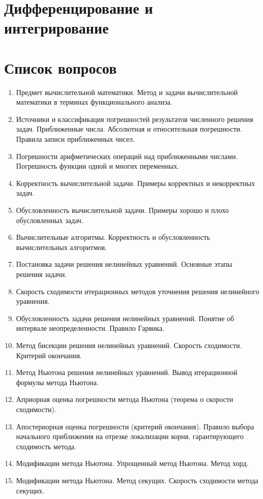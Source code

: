 \documentclass[14pt]{extarticle}
\begin{document}
\section{Дифференцирование и интегрирование}

\section{Список вопросов}
\begin{enumerate}
    \item Предмет вычислительной математики. Метод и задачи вычислительной математики в терминах функционального анализа. 
    \item Источники и классификация погрешностей результатов численного решения задач. Приближенные числа. Абсолютная и относительная погрешности. Правила записи приближенных чисел. 
    \item Погрешности арифметических операций над приближенными числами. Погрешность функции одной и многих переменных. 
    \item Корректность вычислительной задачи. Примеры корректных и некорректных задач. 
    \item Обусловленность вычислительной задачи. Примеры хорошо и плохо обусловленных задач. 
    \item Вычислительные алгоритмы. Корректность и обусловленность вычислительных алгоритмов. 
    \item Постановка задачи решения нелинейных уравнений. Основные этапы решения задачи. 
    \item Скорость сходимости итерационных методов уточнения решения нелинейного уравнения. 
    \item Обусловленность задачи решения нелинейных уравнений. Понятие об интервале неопределенности. Правило Гарвика. 
    \item Метод бисекции решения нелинейных уравнений. Скорость сходимости. Критерий окончания. 
    \item Метод Ньютона решения нелинейных уравнений. Вывод итерационной формулы метода Ньютона. 
    \item Априорная оценка погрешности метода Ньютона (теорема о скорости сходимости). 
    \item Апостериорная оценка погрешности (критерий окончания). Правило выбора начального приближения на отрезке локализации корня, гарантирующего сходимость метода. 
    \item Модификации метода Ньютона. Упрощенный метод Ньютона. Метод хорд. 
    \item Модификации метода Ньютона. Метод секущих. Скорость сходимости метода секущих. 

\end{enumerate}
\end{document}
